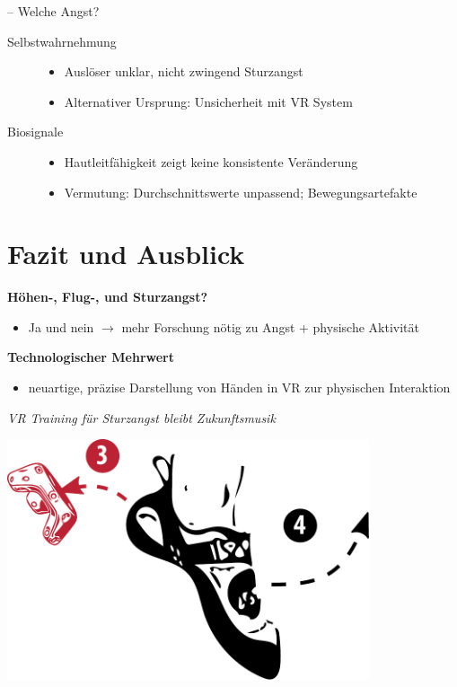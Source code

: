 \begin{frame}{\currentname{} -- Welche Angst?}
\begin{description}
	\item[Selbstwahrnehmung]\mbox{}
	\begin{itemize}[label=\textcolor{tertiary}{}]
		\item Auslöser unklar, nicht zwingend Sturzangst
		\item Alternativer Ursprung: Unsicherheit mit VR System
	\end{itemize}
	\item[Biosignale]\mbox{}
	\begin{itemize}[label=\textcolor{tertiary}{}]
		\item Hautleitfähigkeit zeigt keine konsistente Veränderung
		\item Vermutung: Durchschnittswerte unpassend; Bewegungsartefakte
	\end{itemize}
\end{description}
\end{frame}

\section{Fazit und Ausblick}

\begin{frame}{\currentname{}}
	\textbf{Höhen-, Flug-, \textcolor{secondary}{und Sturzangst?}}
	\begin{itemize}[label=\textcolor{tertiary}{}]
		\item Ja und nein $\rightarrow$ mehr Forschung nötig zu Angst + physische Aktivität
	\end{itemize}
	\textbf{Technologischer Mehrwert}
	\begin{itemize}[label=\textcolor{tertiary}{}]
		\item neuartige, präzise Darstellung von Händen in VR zur physischen Interaktion
	\end{itemize}
	\vfill{}
	\hfill{}\textit{VR  Training für Sturzangst bleibt Zukunftsmusik} \textcolor{secondary}{}
\end{frame}

\begin{frame}[plain]
\begin{center}
	\includegraphics[width=0.8\textwidth]{include/images/climbing-shoe-with-instructions-off.pdf}
\end{center}
\end{frame}
